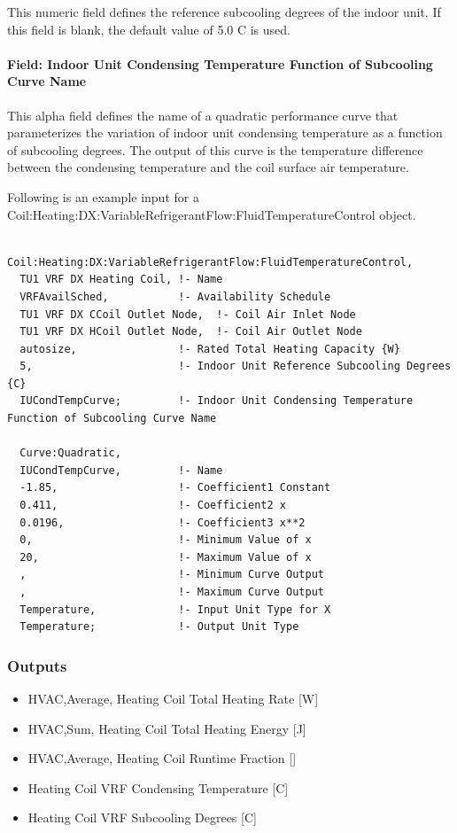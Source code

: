 This numeric field defines the reference subcooling degrees of the indoor unit. If this field is blank, the default value of 5.0 C is used.

\paragraph{Field: Indoor Unit Condensing Temperature Function of Subcooling Curve Name}\label{field-indoor-unit-condensing-temperature-function-of-subcooling-curve-name}

This alpha field defines the name of a quadratic performance curve that parameterizes the variation of indoor unit condensing temperature as a function of subcooling degrees. The output of this curve is the temperature difference between the condensing temperature and the coil surface air temperature.

Following is an example input for a Coil:Heating:DX:VariableRefrigerantFlow:FluidTemperatureControl object.

\begin{lstlisting}

Coil:Heating:DX:VariableRefrigerantFlow:FluidTemperatureControl,
  TU1 VRF DX Heating Coil, !- Name
  VRFAvailSched,           !- Availability Schedule
  TU1 VRF DX CCoil Outlet Node,  !- Coil Air Inlet Node
  TU1 VRF DX HCoil Outlet Node,  !- Coil Air Outlet Node
  autosize,                !- Rated Total Heating Capacity {W}
  5,                       !- Indoor Unit Reference Subcooling Degrees {C}    
  IUCondTempCurve;         !- Indoor Unit Condensing Temperature Function of Subcooling Curve Name

  Curve:Quadratic,
  IUCondTempCurve,         !- Name
  -1.85,                   !- Coefficient1 Constant
  0.411,                   !- Coefficient2 x
  0.0196,                  !- Coefficient3 x**2
  0,                       !- Minimum Value of x    
  20,                      !- Maximum Value of x    
  ,                        !- Minimum Curve Output
  ,                        !- Maximum Curve Output
  Temperature,             !- Input Unit Type for X
  Temperature;             !- Output Unit Type
\end{lstlisting}

\subsubsection{Outputs}\label{outputs-8-002}

\begin{itemize}
\item
  HVAC,Average, Heating Coil Total Heating Rate {[}W{]}
\item
  HVAC,Sum, Heating Coil Total Heating Energy {[}J{]}
\item
  HVAC,Average, Heating Coil Runtime Fraction {[]}
\item
  Heating Coil VRF Condensing Temperature {[}C{]}
\item
  Heating Coil VRF Subcooling Degrees {[}C{]}
\end{itemize}

